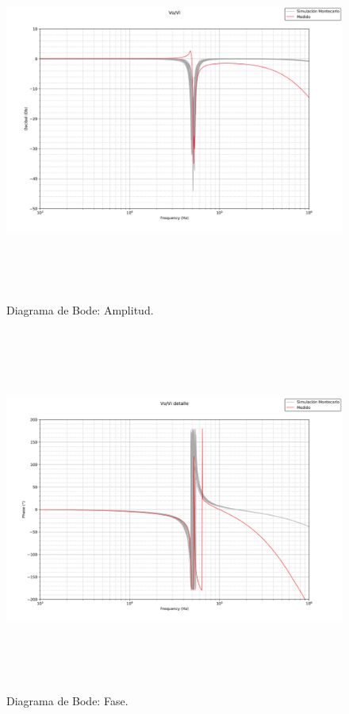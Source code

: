  \begin{figure}[H] %
	\centering	\includegraphics[width=12cm,height=12cm,keepaspectratio]{../EJ4/graficos/bode_medido_lindo_amplitud.png}
	\caption{Diagrama de Bode: Amplitud.}
	\label{bode_mod}
\end{figure}


 \begin{figure}[H] %
	\centering	\includegraphics[width=12cm,height=12cm,keepaspectratio]{../EJ4/graficos/phase_bode.png}
	\caption{Diagrama de Bode: Fase.}
	\label{bode_ph}
\end{figure}

